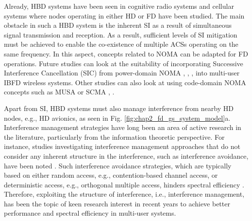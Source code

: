 Already, HBD systems have been seen in cognitive radio systems \cite{li2014linear} and cellular systems \cite{yin2013full,jang2015spatial,cirik2016robust} where nodes operating in either HD or FD have been studied. The main obstacle in such a HBD system is the inherent SI as a result of simultaneous signal transmission and reception. As a result, sufficient levels of SI mitigation must be achieved to enable the co-existence of multiple ACSs operating on the same frequency. In this aspect, concepts related to NOMA can be adapted for FD operations. Future studies can look at the suitability of incorporating Successive Interference Cancellation (SIC) from power-domain NOMA \cite{yan2015receiver}, \cite{huang2016full}, \cite{ali2016dynamic}, \cite{zhang2016full} into multi-user IBFD wireless systems. Other studies can also look at using code-domain NOMA concepts such as MUSA or SCMA \cite{yuan2016multi}, \cite{nikopour2013sparse}. 

Apart from SI, HBD systems must also manage interference from nearby HD nodes, e.g., HD avionics, as seen in Fig. \ref{fig:chap2_fd_gs_system_model}a. Interference management strategies have long been an area of active research in the literature, particularly from the information theoretic perspective. For instance, studies investigating interference management approaches that do not consider any inherent structure in the interference, such as interference avoidance, have been noted \cite{qu2014understanding}. Such interference avoidance strategies, which are typically based on either random access, e.g., contention-based channel access, or deterministic access, e.g., orthogonal multiple access, hinders spectral efficiency \cite{qu2014understanding,weber2007transmission}. Therefore, exploiting the structure of interference, i.e., interference management, has been the topic of keen research interest in recent years \cite{qu2014understanding} to achieve better performance \cite{weber2007transmission} and spectral efficiency in multi-user systems. 

